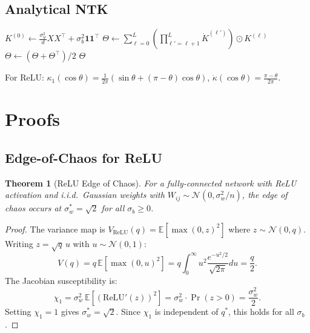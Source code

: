 \documentclass[10pt]{article}
\newtheorem{theorem}{Theorem}[section]
\theoremstyle{definition}
\begin{document}
\subsection{Analytical NTK}

\begin{algorithm}[H]
\SetAlgoLined
{}
$K^{(0)} \leftarrow \frac{\sigma_w^2}{d} X X^\top + \sigma_b^2 \mathbf{1}\mathbf{1}^\top$\;
$\Theta \leftarrow \sum_{\ell=0}^{L} \left(\prod_{\ell'=\ell+1}^{L} \dot{K}^{(\ell')}\right) \odot K^{(\ell)}$\;
$\Theta \leftarrow (\Theta + \Theta^\top)/2$\;
\Return $\Theta$\;
\caption{Analytical NTK for ReLU Networks}
\label{alg:ntk}
\end{algorithm}

For ReLU: $\kappa_1(\cos\theta) = \frac{1}{2\pi}(\sin\theta + (\pi - \theta)\cos\theta)$, $\dot{\kappa}(\cos\theta) = \frac{\pi - \theta}{2\pi}$.

\section{Proofs}
\label{app:proofs}

\subsection{Edge-of-Chaos for ReLU}

\begin{theorem}[ReLU Edge of Chaos]
\label{thm:relu-eoc}
For a fully-connected network with ReLU activation and i.i.d.\ Gaussian weights with $W_{ij} \sim \mathcal{N}(0, \sigma_w^2/n)$, the edge of chaos occurs at $\sigma_w^* = \sqrt{2}$ for all $\sigma_b \geq 0$.
\end{theorem}

\begin{proof}
The variance map is $V_{\text{ReLU}}(q) = \mathbb{E}[\max(0, z)^2]$ where $z \sim \mathcal{N}(0, q)$.
Writing $z = \sqrt{q}\, u$ with $u \sim \mathcal{N}(0,1)$:
\[
  V(q) = q \, \mathbb{E}[\max(0, u)^2] = q \int_0^\infty u^2 \frac{e^{-u^2/2}}{\sqrt{2\pi}} du = \frac{q}{2}.
\]
The Jacobian susceptibility is:
\[
  \chi_1 = \sigma_w^2 \, \mathbb{E}[(\text{ReLU}'(z))^2] = \sigma_w^2 \cdot \Pr(z > 0) = \frac{\sigma_w^2}{2}.
\]
Setting $\chi_1 = 1$ gives $\sigma_w^* = \sqrt{2}$.
Since $\chi_1$ is independent of $q^*$, this holds for all $\sigma_b$.
\end{proof}
\end{document}
